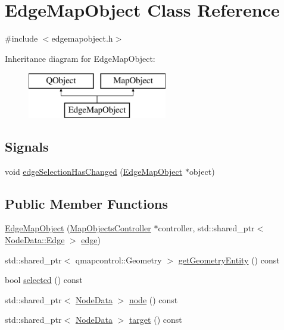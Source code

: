 \hypertarget{class_edge_map_object}{}\section{Edge\+Map\+Object Class Reference}
\label{class_edge_map_object}


{\ttfamily \#include $<$edgemapobject.\+h$>$}

Inheritance diagram for Edge\+Map\+Object\+:\begin{figure}[H]
\begin{center}
\leavevmode
\includegraphics[height=2.000000cm]{d7/d99/class_edge_map_object}
\end{center}
\end{figure}
\subsection*{Signals}
\begin{DoxyCompactItemize}
\item 
void \mbox{\hyperlink{class_edge_map_object_aa3e1087fc4df5083dc8fc0ad6010eeb7}{edge\+Selection\+Has\+Changed}} (\mbox{\hyperlink{class_edge_map_object}{Edge\+Map\+Object}} $\ast$object)
\end{DoxyCompactItemize}
\subsection*{Public Member Functions}
\begin{DoxyCompactItemize}
\item 
\mbox{\hyperlink{class_edge_map_object_a539163cd70096071278b18b1501e3838}{Edge\+Map\+Object}} (\mbox{\hyperlink{class_map_objects_controller}{Map\+Objects\+Controller}} $\ast$controller, std\+::shared\+\_\+ptr$<$ \mbox{\hyperlink{struct_node_data_1_1_edge}{Node\+Data\+::\+Edge}} $>$ \mbox{\hyperlink{structedge}{edge}})
\item 
std\+::shared\+\_\+ptr$<$ qmapcontrol\+::\+Geometry $>$ \mbox{\hyperlink{class_edge_map_object_a5a67249e9896a6931eb5e4819e069c00}{get\+Geometry\+Entity}} () const
\item 
bool \mbox{\hyperlink{class_edge_map_object_a4489e116b68b86423a0a9df62b682c17}{selected}} () const
\item 
std\+::shared\+\_\+ptr$<$ \mbox{\hyperlink{class_node_data}{Node\+Data}} $>$ \mbox{\hyperlink{class_edge_map_object_a7a50daac2d1455401e49d69db3cac61e}{node}} () const
\item 
std\+::shared\+\_\+ptr$<$ \mbox{\hyperlink{class_node_data}{Node\+Data}} $>$ \mbox{\hyperlink{class_edge_map_object_a471bebfdb702d8438d34c89a3158183f}{target}} () const
\end{DoxyCompactItemize}


